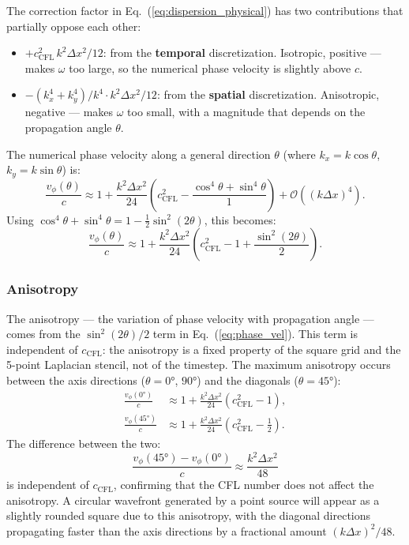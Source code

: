 \documentclass[11pt,a4paper]{article}
\newcommand{\order}[1]{\mathcal{O}(#1)}
\begin{document}
The correction factor in Eq.~(\ref{eq:dispersion_physical}) has two contributions that partially oppose each other:
\begin{itemize}
  \item $+c_{\mathrm{CFL}}^2\,k^2\Delta x^2/12$: from the \textbf{temporal} discretization.  Isotropic, positive --- makes $\omega$ too large, so the numerical phase velocity is slightly above $c$.
  \item $-(k_x^4+k_y^4)/k^4\cdot k^2\Delta x^2/12$: from the \textbf{spatial} discretization.  Anisotropic, negative --- makes $\omega$ too small, with a magnitude that depends on the propagation angle $\theta$.
\end{itemize}
The numerical phase velocity along a general direction $\theta$ (where $k_x = k\cos\theta$, $k_y = k\sin\theta$) is:
\begin{equation}
  \frac{v_\phi(\theta)}{c} \approx 1 + \frac{k^2\Delta x^2}{24}\!\left(c_{\mathrm{CFL}}^2 - \frac{\cos^4\theta + \sin^4\theta}{1}\right) + \order{(k\Delta x)^4}.
\end{equation}
Using $\cos^4\theta + \sin^4\theta = 1 - \tfrac{1}{2}\sin^2(2\theta)$, this becomes:
\begin{equation}
\label{eq:phase_vel}
  \frac{v_\phi(\theta)}{c} \approx 1 + \frac{k^2\Delta x^2}{24}\!\left(c_{\mathrm{CFL}}^2 - 1 + \frac{\sin^2(2\theta)}{2}\right).
\end{equation}

\subsubsection*{Anisotropy}

The anisotropy --- the variation of phase velocity with propagation angle --- comes from the $\sin^2(2\theta)/2$ term in Eq.~(\ref{eq:phase_vel}).  This term is independent of $c_{\mathrm{CFL}}$: the anisotropy is a fixed property of the square grid and the 5-point Laplacian stencil, not of the timestep.  The maximum anisotropy occurs between the axis directions ($\theta = 0°$, $90°$) and the diagonals ($\theta = 45°$):
\begin{align}
  \frac{v_\phi(0°)}{c}  &\approx 1 + \frac{k^2\Delta x^2}{24}(c_{\mathrm{CFL}}^2 - 1), \\
  \frac{v_\phi(45°)}{c} &\approx 1 + \frac{k^2\Delta x^2}{24}\!\left(c_{\mathrm{CFL}}^2 - \frac{1}{2}\right).
\end{align}
The difference between the two:
\begin{equation}
  \frac{v_\phi(45°) - v_\phi(0°)}{c} \approx \frac{k^2\Delta x^2}{48}
\end{equation}
is independent of $c_{\mathrm{CFL}}$, confirming that the CFL number does not affect the anisotropy.  A circular wavefront generated by a point source will appear as a slightly rounded square due to this anisotropy, with the diagonal directions propagating faster than the axis directions by a fractional amount $(k\Delta x)^2/48$.
\end{document}
